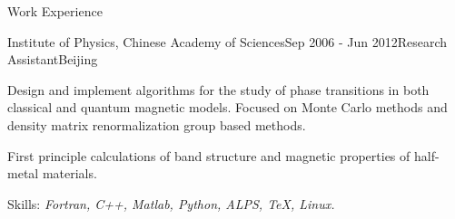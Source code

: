 \documentclass{resume} %
\begin{document}
\begin{rSection}{Work Experience}
\begin{rSubsection}{Institute of Physics, Chinese Academy of Sciences}{Sep 2006 - Jun 2012}{Research Assistant}{Beijing}
\item Design and implement algorithms for the study of phase transitions in both classical and quantum magnetic models. Focused on Monte Carlo methods and density matrix renormalization group based methods.
\item First principle calculations of band structure and magnetic properties of half-metal materials.
\item Skills: {\it Fortran, C++, Matlab, Python, ALPS, \TeX, Linux.}
\end{rSubsection}

\end{rSection}


\newpage
\end{document}
